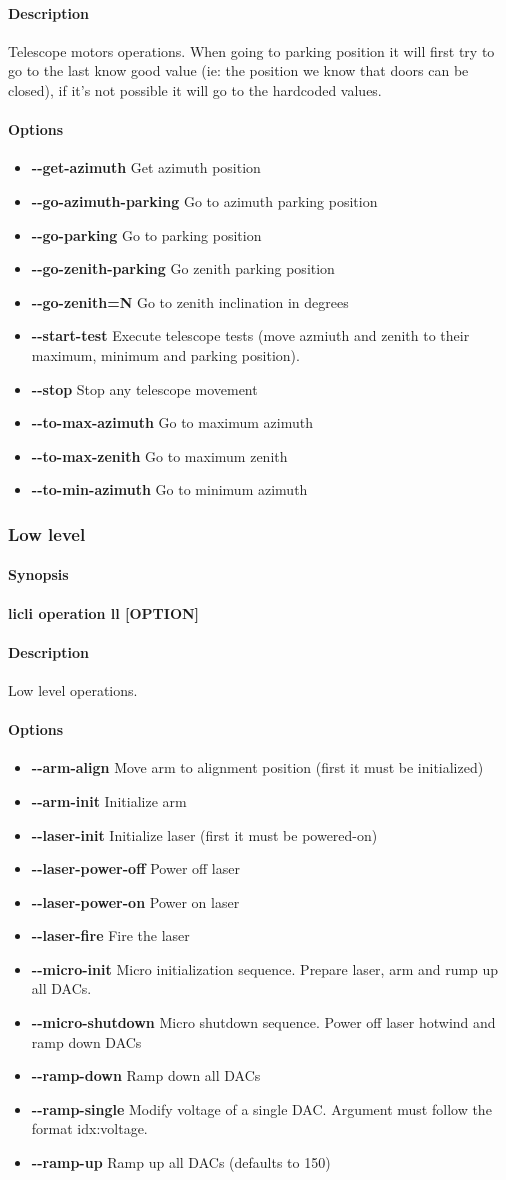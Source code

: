 \documentclass[letterpaper, 10 pt]{article}
\newcommand{\cmdsection}[1]{\paragraph{#1}\mbox{}\par}
\begin{document}
\cmdsection{Description} Telescope motors operations. When going to parking position it will first try to go to the last know good value (ie: the position we know that doors can be closed), if it's not possible it will go to the hardcoded values.\\
\cmdsection{Options}
\begin{itemize}
	\item[] \textbf{-{}-get-azimuth} Get azimuth position
	\item[] \textbf{-{}-go-azimuth-parking} Go to azimuth parking position
	\item[] \textbf{-{}-go-parking} Go to parking position
	\item[] \textbf{-{}-go-zenith-parking} Go zenith parking position
	\item[] \textbf{-{}-go-zenith=N} Go to zenith inclination in degrees
	\item[] \textbf{-{}-start-test} Execute telescope tests (move azmiuth and zenith to their maximum, minimum and parking position).
	\item[] \textbf{-{}-stop} Stop any telescope movement
	\item[] \textbf{-{}-to-max-azimuth} Go to maximum azimuth
	\item[] \textbf{-{}-to-max-zenith} Go to maximum zenith
	\item[] \textbf{-{}-to-min-azimuth} Go to minimum azimuth		
\end{itemize}
\subsubsection{Low level}
\cmdsection{Synopsis} \textbf{licli operation ll [OPTION]}\\

\cmdsection{Description} Low level operations.\\
\cmdsection{Options}
\begin{itemize}
	\item[] \textbf{-{}-arm-align} Move arm to alignment position (first it must be initialized)
	\item[] \textbf{-{}-arm-init} Initialize arm
	\item[] \textbf{-{}-laser-init} Initialize laser (first it must be powered-on)
	\item[] \textbf{-{}-laser-power-off} Power off laser
	\item[] \textbf{-{}-laser-power-on} Power on laser
	\item[] \textbf{-{}-laser-fire} Fire the laser
	\item[] \textbf{-{}-micro-init} Micro initialization sequence. Prepare laser, arm and rump up all DACs.
	\item[] \textbf{-{}-micro-shutdown} Micro shutdown sequence. Power off laser hotwind and ramp down DACs
	\item[] \textbf{-{}-ramp-down} Ramp down all DACs
	\item[] \textbf{-{}-ramp-single} Modify voltage of a single DAC. Argument must follow the format idx:voltage.
	\item[] \textbf{-{}-ramp-up} Ramp up all DACs (defaults to 150)
\end{itemize}
\end{document}
